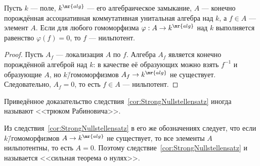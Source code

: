 \documentclass[
	extrafontsizes,
	11pt,
	hyphens,
]{memoir}
\begin{document}
%

\begin{corollary}
Пусть \(k\) --- поле, \(k^\mr{alg}\) --- его алгебраическое замыкание, \(A\) --- конечно порождённая ассоциативная коммутативная унитальная алгебра над \(k\), а \(f \in A\) --- элемент \(A\).
\label{cor:StrongNullstellensatz}
Если для любого гомоморфизма \(\varphi : A \to k^\mr{alg}\) над \(k\) выполняется равенство \(\varphi(f) = 0\), то \(f\) --- нильпотент.
\end{corollary}

\begin{proof}
Пусть \(A_f\) --- локализация \(A\) по \(f\). Алгебра \(A_f\) является конечно порождённой алгеброй над \(k\): в качестве её образующих можно взять \(f^{-1}\) и образующие \(A\), но \(k\)\=/гомоморфизмов \(A_f \to k^\mr{alg}\) не существует. Следовательно, \(A_f = 0\), то есть \(f \in A\) --- нильпотент.
\end{proof}

\begin{remark}
Приведённое доказательство следствия~\ref{cor:StrongNullstellensatz} иногда называют <<трюком Рабиновича>>.
\end{remark}

\begin{remark}
Из следствия~\ref{cor:StrongNullstellensatz} в его же обозначениях следует, что если \(k\)\=/гомоморфизмов \(A \to k^{\mr{alg}}\) не существует, то все элементы \(A\) нильпотентны, то есть \(A = 0\). Поэтому следствие~\ref{cor:StrongNullstellensatz} и называется <<сильная теорема о нулях>>.
\end{remark}
\end{document}
